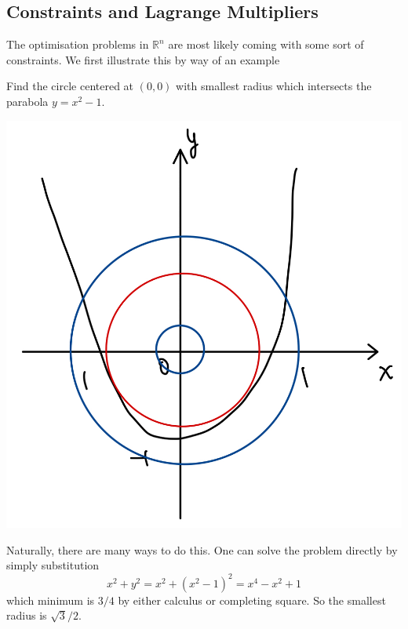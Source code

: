 \documentclass[a4paper]{article}
\begin{document}
\subsection{Constraints and Lagrange Multipliers}
The optimisation problems in $\mathbb R^n$ are most likely coming with some sort of constraints.
We first illustrate this by way of an example
\begin{example}
    Find the circle centered at $(0,0)$ with smallest radius which intersects the parabola $y=x^2-1$.

    \begin{center}
        \includegraphics[scale=0.14]{best_fit_circ.jpeg}
    \end{center}
    
    Naturally, there are many ways to do this.
    One can solve the problem directly by simply substitution
    $$x^2+y^2=x^2+(x^2-1)^2=x^4-x^2+1$$
    which minimum is $3/4$ by either calculus or completing square.
    So the smallest radius is $\sqrt{3}/2$.


\end{example}
\end{document}
